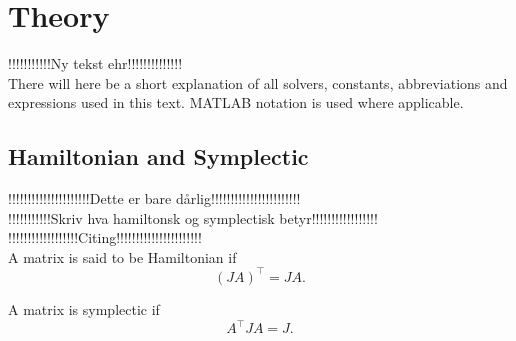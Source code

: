 

\chapter{Theory}
!!!!!!!!!!!Ny tekst ehr!!!!!!!!!!!!!!\\
There will here be a short explanation of all solvers, constants, abbreviations and expressions used in this text. MATLAB notation is used where applicable. 

\section{Hamiltonian and Symplectic}%
!!!!!!!!!!!!!!!!!!!!!Dette er bare dårlig!!!!!!!!!!!!!!!!!!!!!!!\\
!!!!!!!!!!!Skriv hva hamiltonsk og symplectisk betyr!!!!!!!!!!!!!!!!!\\
!!!!!!!!!!!!!!!!!!Citing!!!!!!!!!!!!!!!!!!!!!!\\
A matrix is said to be Hamiltonian if  \cite{!!!!!!!!!!!!!!!!!!!!!!!!}
\begin{equation}
(JA)^{\top} = J A. 
\end{equation}


A matrix is symplectic if \cite{!!!!!!!!!!!!!!!!!!!!!!!!}
\begin{equation}
A^{\top} J A = J. 
\end{equation}








